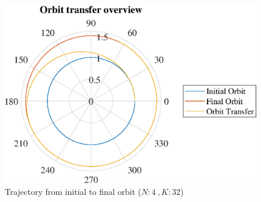 \documentclass[]{article}
\begin{document}
	\begin{figure}
		\centering
		\includegraphics[scale=0.75]{orbit_N4_K32_C2_mf.eps}
		\caption{Trajectory from initial to final orbit (\(N:4\ , K:32\))}
		\label{fig:orbit_N4_K32_C2_mf}
	\end{figure}

	\FloatBarrier
\end{document}
